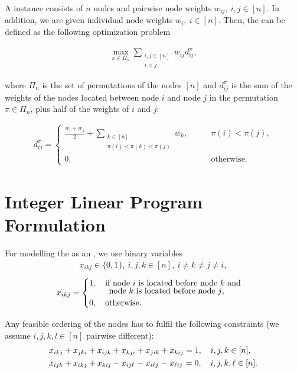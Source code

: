 A \wLOP instance consists of $n$ nodes and pairwise node weights $w_{ij},\ i,j \in [n]$. In addition, we are given individual node weights $w_{i},\ i \in [n]$. Then, the \wLOP can be defined as the following optimization problem

\begin{align*}
\max_{\pi \in \Pi_n} \sum_{\substack{i,j \in [n]\\i<j}}w_{ij}d_{ij}^{\pi},
\end{align*}\label{def:wlop}%

where $\Pi_{n}$ is the set of permutations of the 
nodes $[n]$ and $d_{ij}^{\pi}$ is the sum of the weights of the nodes located between
node $i$ and node $j$ in the permutation $\pi \in \Pi_n$, plus half of the weights of  $i$ and $j$:

\begin{align*}
d_{ij}^{\pi} = \begin{cases} \frac{w_i+w_j}{2} + \sum\limits_{\substack{k \in [n]\\\pi(i) <
		\pi(k) < \pi(j)}}w_k,\qquad  & \pi(i) < \pi(j),\\
0, & \text{otherwise}.
\end{cases}
\end{align*}

\section{Integer Linear Program Formulation}

For modelling the \wLOP as an \ILP, we use binary variables 
\begin{align*} 
x_{ikj} \in \{0,1\},\ i,j,k \in [n],\ i \neq k \neq j \neq i, %
\end{align*}
\begin{align*}
x_{ikj} = \begin{cases} 1, \quad \text{if node $i$ is located before node $k$ and} \vspace{-5 pt}\\  
\hspace{24 pt} \text{node $k$ is located before node $j$,} \\
0, \quad \text{otherwise.} \end{cases}
\end{align*}

Any feasible ordering of the nodes has to fulfil the following constraints (we assume $i,j,k,l \in [n]$ pairwise different):
\begin{align}
&x_{ikj} + x_{jki} + x_{ijk} + x_{kji} + x_{jik} + x_{kij} = 1, \quad i, j, k \in [n], \label{c1}\\ 
&x_{ijk} + x_{ikj} + x_{kij} - x_{ij\ell} \hspace{1 pt} - x_{i\ell j} \hspace{1 pt} - x_{\ell ij} \hspace{1 pt} = 0, \quad i, j, k, \ell \in [n].\label{c2}
\end{align}

